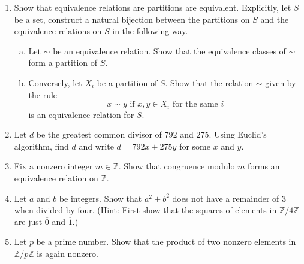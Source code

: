 \documentclass[11pt]{article}
\begin{document}
\begin{enumerate}
\begin{enumerate}[(a)]
\end{enumerate}
\item Show that equivalence relations are partitions are equivalent.  Explicitly, let $S$ be a set, construct a natural bijection between the partitions on $S$ and the equivalence relations on $S$ in the following way.
\begin{enumerate}[(a)]
\item Let $\sim$ be an equivalence relation.  Show that the equivalence classes of $\sim$ form a partition of $S$.
\item Conversely, let ${X_i}$ be a partition of $S$.  Show that the relation $\sim$ given by the rule
\[x\sim y\text{ if }x,y\in X_i\text{ for the same }i\]
is an equivalence relation for $S$.
\end{enumerate}
\item Let $d$ be the greatest common divisor of $792$ and $275$.  Using Euclid's algorithm, find $d$ and write $d=792x + 275y$ for some $x$ and $y$.
\item Fix a nonzero integer $m\in\mathbb{Z}$.  Show that congruence modulo $m$ forms an equivalence relation on $\mathbb{Z}$.
\item Let $a$ and $b$ be integers.  Show that $a^2+b^2$ does not have a remainder of 3 when divided by four.  (Hint: First show that the squares of elements in $\mathbb{Z}/4\mathbb{Z}$ are just $\overline 0$ and $\overline 1$.)
\item Let $p$ be a prime number.  Show that the product of two nonzero elements in $\mathbb{Z}/p\mathbb{Z}$ is again nonzero.
\end{enumerate}
\end{document}
